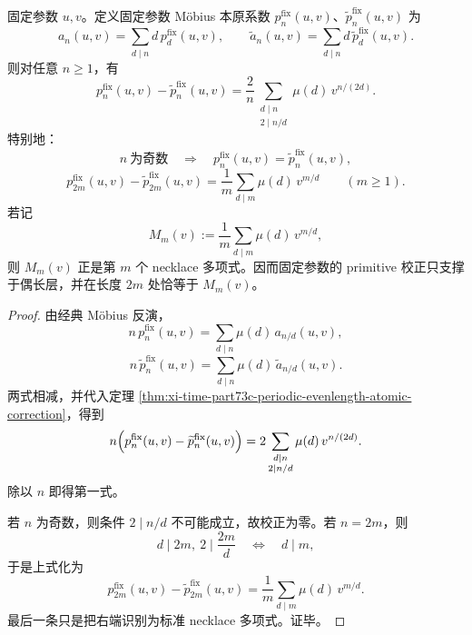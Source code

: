 \begin{corollary}\label{cor:xi-time-part73c-fixed-parameter-necklace-correction}
固定参数 \(u,v\)。定义固定参数 Möbius 本原系数 \(p_n^{\mathrm{fix}}(u,v)\)、\(\widetilde p_n^{\mathrm{fix}}(u,v)\) 为
\[
a_n(u,v)=\sum_{d\mid n} d\,p_d^{\mathrm{fix}}(u,v),
\qquad
\widetilde a_n(u,v)=\sum_{d\mid n} d\,\widetilde p_d^{\mathrm{fix}}(u,v).
\]
则对任意 \(n\ge 1\)，有
\[
p_n^{\mathrm{fix}}(u,v)-\widetilde p_n^{\mathrm{fix}}(u,v)
=
\frac{2}{n}
\sum_{\substack{d\mid n\\ 2\mid n/d}}
\mu(d)\,v^{n/(2d)}.
\]
特别地：
\[
n\ \text{为奇数}
\quad\Longrightarrow\quad
p_n^{\mathrm{fix}}(u,v)=\widetilde p_n^{\mathrm{fix}}(u,v),
\]
\[
p_{2m}^{\mathrm{fix}}(u,v)-\widetilde p_{2m}^{\mathrm{fix}}(u,v)
=
\frac{1}{m}\sum_{d\mid m}\mu(d)\,v^{m/d}
\qquad (m\ge 1).
\]
若记
\[
M_m(v):=\frac{1}{m}\sum_{d\mid m}\mu(d)\,v^{m/d},
\]
则 \(M_m(v)\) 正是第 \(m\) 个 necklace 多项式。因而固定参数的 primitive 校正只支撑于偶长层，并在长度 \(2m\) 处恰等于 \(M_m(v)\)。
\end{corollary}
\begin{proof}
由经典 Möbius 反演，
\[
n\,p_n^{\mathrm{fix}}(u,v)=\sum_{d\mid n}\mu(d)\,a_{n/d}(u,v),
\]
\[
n\,\widetilde p_n^{\mathrm{fix}}(u,v)=\sum_{d\mid n}\mu(d)\,\widetilde a_{n/d}(u,v).
\]
两式相减，并代入定理 \ref{thm:xi-time-part73c-periodic-evenlength-atomic-correction}，得到
\[
n\Bigl(
p_n^{\mathrm{fix}}(u,v)-\widetilde p_n^{\mathrm{fix}}(u,v)
\Bigr)
=
2\sum_{\substack{d\mid n\\ 2\mid n/d}}
\mu(d)\,v^{n/(2d)}.
\]
除以 \(n\) 即得第一式。

若 \(n\) 为奇数，则条件 \(2\mid n/d\) 不可能成立，故校正为零。若 \(n=2m\)，则
\[
d\mid 2m,\ 2\mid \frac{2m}{d}
\quad\Longleftrightarrow\quad
d\mid m,
\]
于是上式化为
\[
p_{2m}^{\mathrm{fix}}(u,v)-\widetilde p_{2m}^{\mathrm{fix}}(u,v)
=
\frac{1}{m}\sum_{d\mid m}\mu(d)\,v^{m/d}.
\]
最后一条只是把右端识别为标准 necklace 多项式。证毕。
\end{proof}

\endinput
